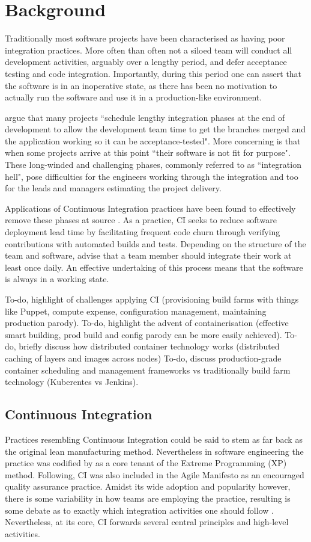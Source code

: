 \documentclass{report}
\begin{document}
\section{Background}
Traditionally most software projects have been characterised as having
poor integration practices. More often than often not a siloed team 
will conduct all development activities, arguably over a lengthy period,
and defer acceptance testing and code integration. Importantly, during
this period one can assert that the software is in an inoperative state, as there has
been no motivation to actually run the software and use it in a
production-like environment.
\par 
\citet{Jez} argue that many projects ``schedule lengthy integration phases at
the end of development to allow the development team time to get the branches
merged and the application working so it can be acceptance-tested". More concerning
is that when some projects arrive at this point ``their software is not fit for
purpose". These long-winded and challenging phases, commonly referred
to as ``integration hell", pose difficulties for the engineers working through the integration
and too for the leads and managers estimating the project delivery.
\par
Applications of Continuous Integration practices have been found to effectively 
remove these phases at source \citep{Vas, Fitz, Jez, Duvall}. As a practice, CI seeks to reduce software deployment lead time by
facilitating frequent code churn through verifying contributions with automated 
builds and tests. Depending on the structure of the team and software, \citet{Jez} 
advise that a team member should integrate their work at least once daily. An effective 
undertaking of this process means that the software is always in a working state. 
\par
To-do, highlight of challenges applying CI (provisioning build farms with things like Puppet, compute expense, configuration management, maintaining production parody). 
To-do, highlight the advent of containerisation (effective smart building, prod build and config parody can be more easily achieved).
To-do, briefly discuss how distributed container technology works (distributed caching of layers and images across nodes)
To-do, discuss production-grade container scheduling and management frameworks vs traditionally build farm technology (Kuberentes vs Jenkins).

\subsection{Continuous Integration}
Practices resembling Continuous Integration could be said
to stem as far back as the original lean manufacturing method. 
Nevertheless in software
engineering the practice was codified by \citet{Beck} 
as a core tenant of the Extreme Programming (XP) method.
Following, CI was also included in the Agile Manifesto as an encouraged
quality assurance practice. Amidst its wide adoption and popularity however, 
there is some variability in how teams are employing the practice, resulting 
is some debate as to exactly which integration activities one should follow \citep{Stahl}.
Nevertheless, at its core, CI forwards several central principles and high-level activities.
\end{document}
